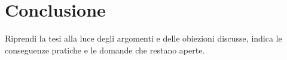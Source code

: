 \chapter{Conclusione}

Riprendi la tesi alla luce degli argomenti e delle obiezioni discusse, indica
le conseguenze pratiche e le domande che restano aperte.
